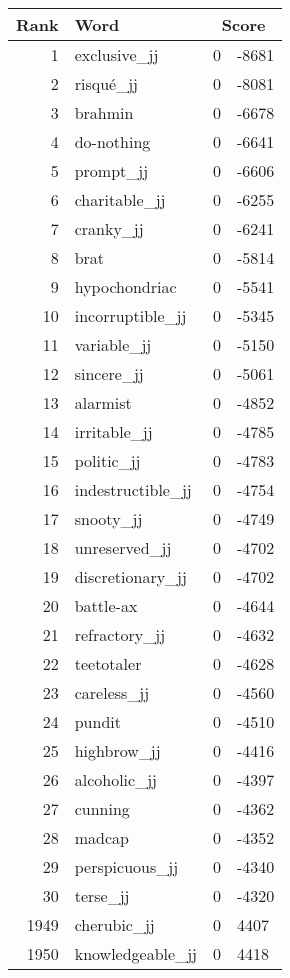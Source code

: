 \begin{longtable}[!htbp]{| rlr@{.}l |}
    \hline
    \textbf{Rank} & \textbf{Word} & \multicolumn{2}{c|}{\textbf{Score}} \\
    \hline
    \endhead
    1 & exclusive\_jj & 0 & -8681 \\
    2 & risqué\_jj & 0 & -8081 \\
    3 & brahmin & 0 & -6678 \\
    4 & do-nothing & 0 & -6641 \\
    5 & prompt\_jj & 0 & -6606 \\
    6 & charitable\_jj & 0 & -6255 \\
    7 & cranky\_jj & 0 & -6241 \\
    8 & brat & 0 & -5814 \\
    9 & hypochondriac & 0 & -5541 \\
    10 & incorruptible\_jj & 0 & -5345 \\
    11 & variable\_jj & 0 & -5150 \\
    12 & sincere\_jj & 0 & -5061 \\
    13 & alarmist & 0 & -4852 \\
    14 & irritable\_jj & 0 & -4785 \\
    15 & politic\_jj & 0 & -4783 \\
    16 & indestructible\_jj & 0 & -4754 \\
    17 & snooty\_jj & 0 & -4749 \\
    18 & unreserved\_jj & 0 & -4702 \\
    19 & discretionary\_jj & 0 & -4702 \\
    20 & battle-ax & 0 & -4644 \\
    21 & refractory\_jj & 0 & -4632 \\
    22 & teetotaler & 0 & -4628 \\
    23 & careless\_jj & 0 & -4560 \\
    24 & pundit & 0 & -4510 \\
    25 & highbrow\_jj & 0 & -4416 \\
    26 & alcoholic\_jj & 0 & -4397 \\
    27 & cunning & 0 & -4362 \\
    28 & madcap & 0 & -4352 \\
    29 & perspicuous\_jj & 0 & -4340 \\
    30 & terse\_jj & 0 & -4320 \\
    1949 & cherubic\_jj & 0 & 4407 \\
    1950 & knowledgeable\_jj & 0 & 4418 \\

\end{longtable}
